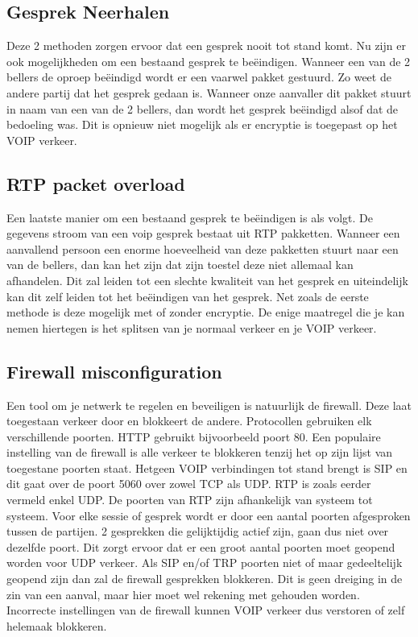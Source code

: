 \documentclass[pdftex,a4paper,12pt,twoside]{report}
\begin{document}
\subsection{Gesprek Neerhalen}
Deze 2 methoden zorgen ervoor dat een gesprek nooit tot stand komt. Nu zijn er ook mogelijkheden om een bestaand gesprek te beëindigen. Wanneer een van de 2 bellers de oproep beëindigd wordt er een vaarwel pakket gestuurd. Zo weet de andere partij dat het gesprek gedaan is. Wanneer onze aanvaller dit pakket stuurt in naam van een van de 2 bellers, dan wordt het gesprek beëindigd alsof dat de bedoeling was. Dit is opnieuw niet mogelijk als er encryptie is toegepast op het VOIP verkeer.

\subsection{RTP packet overload}
Een laatste manier om een bestaand gesprek te beëindigen is als volgt. De gegevens stroom van een voip gesprek bestaat uit RTP pakketten. Wanneer een aanvallend persoon een enorme hoeveelheid van deze pakketten stuurt naar een van de bellers, dan kan het zijn dat zijn toestel deze niet allemaal kan afhandelen. Dit zal leiden tot een slechte kwaliteit van het gesprek en uiteindelijk kan dit zelf leiden tot het beëindigen van het gesprek. Net zoals de eerste methode is deze mogelijk met of zonder encryptie. De enige maatregel die je kan nemen hiertegen is het splitsen van je normaal verkeer en je VOIP verkeer.

\subsection{Firewall misconfiguration}
Een tool om je netwerk te regelen en beveiligen is natuurlijk de firewall. Deze laat toegestaan verkeer door en blokkeert de andere. Protocollen gebruiken elk verschillende poorten. HTTP gebruikt bijvoorbeeld poort 80. Een populaire instelling van de firewall is alle verkeer te blokkeren tenzij het op zijn lijst van toegestane poorten staat. Hetgeen VOIP verbindingen tot stand brengt is SIP en dit gaat over de poort 5060 over zowel TCP als UDP. RTP is zoals eerder vermeld enkel UDP. De poorten van RTP zijn afhankelijk van systeem tot systeem. Voor elke sessie of gesprek wordt er door een aantal poorten afgesproken tussen de partijen. 2 gesprekken die gelijktijdig actief zijn, gaan dus niet over dezelfde poort. Dit zorgt ervoor dat er een groot aantal poorten moet geopend worden voor UDP verkeer. Als SIP en/of TRP poorten niet of maar gedeeltelijk geopend zijn dan zal de firewall gesprekken blokkeren. Dit is geen dreiging in de zin van een aanval, maar hier moet wel rekening met gehouden worden. Incorrecte instellingen van de firewall kunnen VOIP verkeer dus verstoren of zelf helemaak blokkeren.
\end{document}
